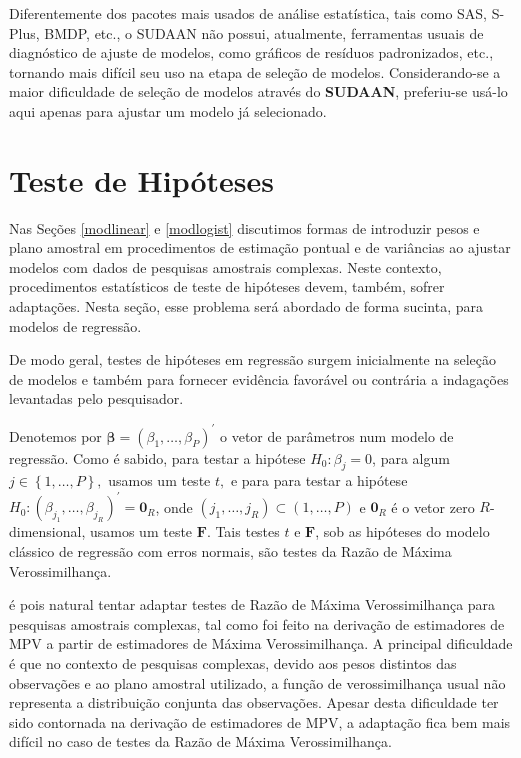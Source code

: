 \documentclass[]{book}
\theoremstyle{definition}
\theoremstyle{definition}
\theoremstyle{definition}
\theoremstyle{remark}
\begin{document}
Diferentemente dos pacotes mais usados de análise estatística, tais como
SAS, S-Plus, BMDP, etc., o SUDAAN não possui, atualmente, ferramentas
usuais de diagnóstico de ajuste de modelos, como gráficos de resíduos
padronizados, etc., tornando mais difícil seu uso na etapa de seleção de
modelos. Considerando-se a maior dificuldade de seleção de modelos
através do \textbf{SUDAAN}, preferiu-se usá-lo aqui apenas para ajustar
um modelo já selecionado.

\section{Teste de Hipóteses}\label{teste-de-hipoteses}

Nas Seções \ref{modlinear} e \ref{modlogist} discutimos formas de
introduzir pesos e plano amostral em procedimentos de estimação pontual
e de variâncias ao ajustar modelos com dados de pesquisas amostrais
complexas. Neste contexto, procedimentos estatísticos de teste de
hipóteses devem, também, sofrer adaptações. Nesta seção, esse problema
será abordado de forma sucinta, para modelos de regressão.

De modo geral, testes de hipóteses em regressão surgem inicialmente na
seleção de modelos e também para fornecer evidência favorável ou
contrária a indagações levantadas pelo pesquisador.

Denotemos por
\(\mathbf{\beta }=\left( \beta _{1},\ldots ,\beta _{P}\right) ^{\prime }\)
o vetor de parâmetros num modelo de regressão. Como é sabido, para
testar a hipótese \(H_{0}:\beta _{j}=0\), para algum
\(j\in \left\{ 1,\ldots ,P\right\} \mathbf{,}\) usamos um teste \(t,\) e
para para testar a hipótese
\(H_{0}:\left( \beta _{j_{1}},\ldots ,\beta _{j_{R}}\right) ^{\prime }=\mathbf{0}_{R}\),
onde
\(\left( j_{1},\ldots ,j_{R}\right) \subset \left( 1,\ldots ,P\right)\)
e \(\mathbf{0}_{R}\) é o vetor zero \(R\)-dimensional, usamos um teste
\(\mathbf{F}\). Tais testes \(t\) e \(\mathbf{F}\), sob as hipóteses do
modelo clássico de regressão com erros normais, são testes da Razão de
Máxima Verossimilhança.

é pois natural tentar adaptar testes de Razão de Máxima Verossimilhança
para pesquisas amostrais complexas, tal como foi feito na derivação de
estimadores de MPV a partir de estimadores de Máxima Verossimilhança. A
principal dificuldade é que no contexto de pesquisas complexas, devido
aos pesos distintos das observações e ao plano amostral utilizado, a
função de verossimilhança usual não representa a distribuição conjunta
das observações. Apesar desta dificuldade ter sido contornada na
derivação de estimadores de MPV, a adaptação fica bem mais difícil no
caso de testes da Razão de Máxima Verossimilhança.
\end{document}
